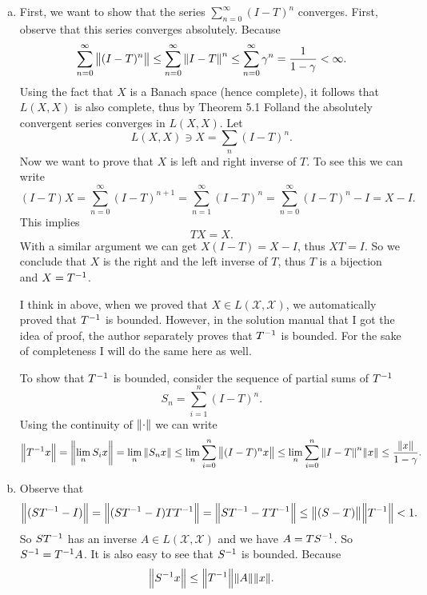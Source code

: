 \begin{problem}[Folland: Ch5,P7]
	\begin{solution}
		\begin{enumerate}[(a)]
			\item First, we want to show that the series $ \sum_{n=0}^\infty (I-T)^n  $ converges. First, observe that this series converges absolutely. Because
			\[ \sum_{n=0}^\infty \norm{(I-T)^n} \leq \sum_{n=0}^\infty \norm{I-T}^n  \leq \sum_{n=0}^{\infty} \gamma^n = \frac{1}{1-\gamma} < \infty. \]
			Using the fact that $ X $ is a Banach space (hence complete), it follows that $ L(X,X) $ is also complete, thus by Theorem 5.1 Folland the absolutely convergent series converges in $ L(X,X) $. Let 
			\[ L(X,X) \ni X = \sum_n (I-T)^n. \]
			Now we want to prove that $ X $ is left and right inverse of $ T $. To see this we can write
			\[ (I-T)X = \sum_{n=0}^\infty (I-T)^{n+1} = \sum_{n=1}^{\infty} (I-T)^n = \sum_{n=0}^{\infty} (I-T)^n - I = X-I. \]
			This implies
			\[ TX = X. \]
			With a similar argument we can get $ X(I-T) = X-I $, thus $ XT = I $. So we conclude that $ X $ is the right and the left inverse of $ T $, thus $ T $ is a bijection and $ X = T^{-1} $.
			\begin{remark}
				I think in above, when we proved that $ X \in L(\mathcal{X},\mathcal{X}) $, we automatically proved that $ T^{-1} $ is bounded. However, in the solution manual that I got the idea of proof, the author separately proves that $ T^{-1} $ is bounded. For the sake of completeness I will do the same here as well.
			\end{remark}
			To show that $ T^{-1} $ is bounded, consider the sequence of partial sums of $ T^{-1} $
			\[ S_n = \sum_{i=1}^n (I-T)^n. \]
			Using the continuity of $ \norm{\cdot} $ we can write
			\[ \norm{T^{-1}x} = \norm{\lim_{n} S_i x} = \lim_{n} \norm{S_n x} \leq \lim_n \sum_{i=0}^n \norm{(I-T)^nx} \leq \lim_n \sum_{i=0}^n \norm{I-T}^n \norm{x} \leq \frac{\norm{x}}{1-\gamma}. \]
			
			\item Observe that 
			\[ \norm{(ST^{-1} - I)} = \norm{(ST^{-1}-I)TT^{-1}} = \norm{ST^{-1} - TT^{-1}} \leq \norm{(S-T)}\norm{T^{-1}} < 1. \]
			So $ ST^{-1} $ has an inverse $ A \in L(\mathcal{X},\mathcal{X}) $ and we have $ A = TS^{-1} $. So $ S^{-1} = T^{-1}A $. It is also easy to see that $ S^{-1} $ is bounded. Because
			\[ \norm{S^{-1}x} \leq \norm{T^{-1}}\norm{A}\norm{x}. \]
		\end{enumerate}
		
	\end{solution}
\end{problem}